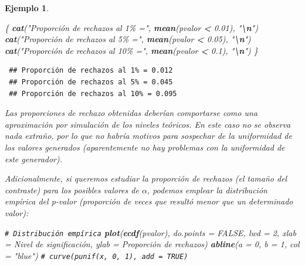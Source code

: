 \documentclass[
  spanish,
  10pt,
]{book}
\newenvironment{Shaded}{\begin{snugshade}}{\end{snugshade}}
\newcommand{\AttributeTok}[1]{\textcolor[rgb]{0.13,0.29,0.53}{#1}}
\newcommand{\CommentTok}[1]{\textcolor[rgb]{0.56,0.35,0.01}{\textit{#1}}}
\newcommand{\ConstantTok}[1]{\textcolor[rgb]{0.56,0.35,0.01}{#1}}
\newcommand{\DecValTok}[1]{\textcolor[rgb]{0.00,0.00,0.81}{#1}}
\newcommand{\FloatTok}[1]{\textcolor[rgb]{0.00,0.00,0.81}{#1}}
\newcommand{\FunctionTok}[1]{\textcolor[rgb]{0.13,0.29,0.53}{\textbf{#1}}}
\newcommand{\NormalTok}[1]{#1}
\newcommand{\SpecialCharTok}[1]{\textcolor[rgb]{0.81,0.36,0.00}{\textbf{#1}}}
\newcommand{\StringTok}[1]{\textcolor[rgb]{0.31,0.60,0.02}{#1}}
\theoremstyle{break}
\newtheorem{example}{Ejemplo}[chapter]
\theoremstyle{nonumberplain}
\renewcommand{\CommentTok}[1]{\textcolor[rgb]{0.41,0.41,0.41}{\texttt{#1}}}
\begin{document}
\begin{example}
\begin{Shaded}
\begin{Highlighting}[]
\NormalTok{\{}
\FunctionTok{cat}\NormalTok{(}\StringTok{"Proporción de rechazos al 1\% ="}\NormalTok{, }\FunctionTok{mean}\NormalTok{(pvalor }\SpecialCharTok{\textless{}} \FloatTok{0.01}\NormalTok{), }\StringTok{"}\SpecialCharTok{\textbackslash{}n}\StringTok{"}\NormalTok{)}
\FunctionTok{cat}\NormalTok{(}\StringTok{"Proporción de rechazos al 5\% ="}\NormalTok{, }\FunctionTok{mean}\NormalTok{(pvalor }\SpecialCharTok{\textless{}} \FloatTok{0.05}\NormalTok{), }\StringTok{"}\SpecialCharTok{\textbackslash{}n}\StringTok{"}\NormalTok{)}
\FunctionTok{cat}\NormalTok{(}\StringTok{"Proporción de rechazos al 10\% ="}\NormalTok{, }\FunctionTok{mean}\NormalTok{(pvalor }\SpecialCharTok{\textless{}} \FloatTok{0.1}\NormalTok{), }\StringTok{"}\SpecialCharTok{\textbackslash{}n}\StringTok{"}\NormalTok{)}
\NormalTok{\}}
\end{Highlighting}
\end{Shaded}

\begin{verbatim}
 ## Proporción de rechazos al 1% = 0.012 
 ## Proporción de rechazos al 5% = 0.045 
 ## Proporción de rechazos al 10% = 0.095
\end{verbatim}

Las proporciones de rechazo obtenidas deberían comportarse como una aproximación por simulación de los niveles teóricos.
En este caso no se observa nada extraño, por lo que no habría motivos para sospechar de la uniformidad de los valores generados (aparentemente no hay problemas con la uniformidad de este generador).

Adicionalmente, si queremos estudiar la proporción de rechazos (el \emph{tamaño del contraste}) para los posibles valores de \(\alpha\), podemos emplear la distribución empírica del p-valor (proporción de veces que resultó menor que un determinado valor):

\begin{Shaded}
\begin{Highlighting}[]
\CommentTok{\# Distribución empírica}
\FunctionTok{plot}\NormalTok{(}\FunctionTok{ecdf}\NormalTok{(pvalor), }\AttributeTok{do.points =} \ConstantTok{FALSE}\NormalTok{, }\AttributeTok{lwd =} \DecValTok{2}\NormalTok{, }
     \AttributeTok{xlab =} \StringTok{\textquotesingle{}Nivel de significación\textquotesingle{}}\NormalTok{, }\AttributeTok{ylab =} \StringTok{\textquotesingle{}Proporción de rechazos\textquotesingle{}}\NormalTok{)}
\FunctionTok{abline}\NormalTok{(}\AttributeTok{a =} \DecValTok{0}\NormalTok{, }\AttributeTok{b =} \DecValTok{1}\NormalTok{, }\AttributeTok{col =} \StringTok{"blue"}\NormalTok{)   }\CommentTok{\# curve(punif(x, 0, 1), add = TRUE)}
\end{Highlighting}
\end{Shaded}


\end{example}
\end{document}
